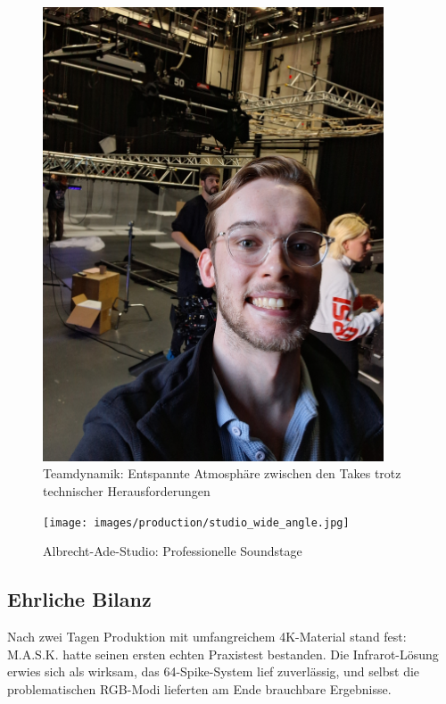 \begin{figure}[h]
   \centering
   \includegraphics[width=0.9\textwidth]{images/onSetImages/MartySmileyIntoCameraOnSet.jpg}
   \caption{Teamdynamik: Entspannte Atmosphäre zwischen den Takes trotz technischer Herausforderungen}
   \label{fig:team_atmosphere}
\end{figure}

\begin{figure}[h]
   \centering
   \texttt{[image: images/production/studio\_wide\_angle.jpg]}
   \caption{Albrecht-Ade-Studio: Professionelle Soundstage}
   \label{fig:studio_wide}
\end{figure}

\newpage

\subsection{Ehrliche Bilanz}

Nach zwei Tagen Produktion mit umfangreichem 4K-Material stand fest: M.A.S.K. hatte seinen ersten echten Praxistest bestanden. Die Infrarot-Lösung erwies sich als wirksam, das 64-Spike-System lief zuverlässig, und selbst die problematischen RGB-Modi lieferten am Ende brauchbare Ergebnisse.

